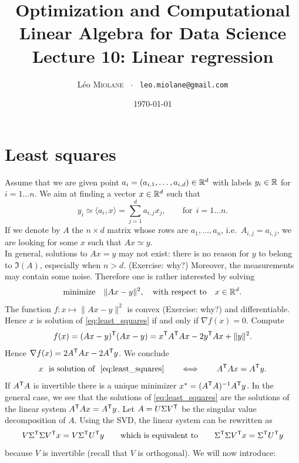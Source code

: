 \documentclass[11pt,nocut]{article}
\title{\vspace{-2.0cm}%
	Optimization and Computational Linear Algebra for Data Science\\
Lecture 10: Linear regression}
\author{Léo \textsc{Miolane} \ $\cdot$ \ \texttt{leo.miolane@gmail.com}}
\date{\today}
\begin{document}
\maketitle


\section{Least squares}

Assume that we are given point $a_i = (a_{i,1}, \dots, a_{i,d}) \in \mathbb{R}^d$ with labels $y_i \in \mathbb{R}$ for $i=1 \dots n$.
We aim at finding a vector $x\in\mathbb{R}^d$ such that
$$
y_i \simeq \langle a_i, x \rangle = \sum_{j=1}^d a_{i,j} x_j, \qquad \text{for} \ \ i=1 \dots n.
$$
If we denote by $A$ the $n \times d$ matrix whose rows are $a_1, \dots, a_n$, i.e.\ $A_{i,j} = a_{i,j}$, we are looking for some $x$ such that $Ax \simeq y$.
\\

In general, solutions to $Ax=y$ may not exist: there is no reason for $y$ to belong to $\Im(A)$, especially when $n > d$. (Exercise: why?)
Moreover, the measurements may contain some noise.
Therefore one is rather interested by solving
\begin{equation}\label{eq:least_squares}
	\text{minimize} \quad \| Ax - y \|^2, \quad \text{with respect to} \quad x \in \mathbb{R}^d.
\end{equation}
The function $f: x \mapsto \|Ax - y\|^2$ is convex (Exercise: why?) and differentiable. Hence
$x$ is solution of \eqref{eq:least_squares} if and only if $\nabla f (x) = 0$. Compute
$$
f(x) = (Ax - y)^{{\sf T}}(Ax - y) = x^{{\sf T}} A^{{\sf T}} A x - 2 y^{{\sf T}} A x + \|y\|^2.
$$
Hence $\nabla f(x) = 2 A^{{\sf T}} A x - 2 A^{{\sf T}} y$. We conclude
$$
x \ \ \text{is solution of} \ \ \eqref{eq:least_squares} \qquad
\Longleftrightarrow
\qquad A^{\sT} A x = A^{\sT} y.
$$
If $A^{{\sf T}} A$ is invertible there is a unique minimizer $x^* = (A^{{\sf T}} A)^{-1} A^{{\sf T}} y$.
In the general case, we see that the solutions of \eqref{eq:least_squares} are the solutions of the linear system $A^{{\sf T}} A x = A^{{\sf T}} y$. 
Let $A=U\Sigma V^{{\sf T}}$ be the singular value decomposition of $A$. Using the SVD, the linear system can be rewritten as
\begin{equation}\label{eq:simpSVD}
V \Sigma^{{\sf T}} \Sigma V^{{\sf T}} x = V \Sigma^{{\sf T}} U^{{\sf T}} y
\qquad
\text{which is equivalent to}
\qquad
\Sigma^{{\sf T}} \Sigma V^{{\sf T}} x = \Sigma^{{\sf T}} U^{{\sf T}} y
\end{equation}
because $V$ is invertible (recall that $V$ is orthogonal). We will now introduce:
\end{document}

